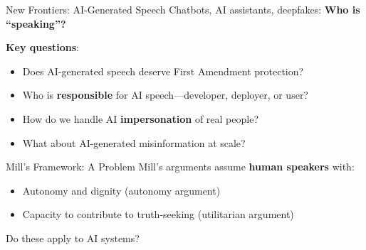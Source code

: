 ﻿\documentclass[aspectratio=169,11pt]{beamer}
\begin{document}
\begin{frame}{New Frontiers: AI-Generated Speech}
Chatbots, AI assistants, deepfakes: \textbf{Who is ``speaking''?}

\vspace{0.3cm}
\textbf{Key questions}:
\begin{itemize}
    \item Does AI-generated speech deserve First Amendment protection?
    \item Who is \textbf{responsible} for AI speech---developer, deployer, or user?
    \item How do we handle AI \textbf{impersonation} of real people?
    \item What about AI-generated misinformation at scale?
\end{itemize}

\vspace{0.3cm}
\begin{alertblock}{Mill's Framework: A Problem}
Mill's arguments assume \textbf{human speakers} with:
\begin{itemize}
    \item Autonomy and dignity (autonomy argument)
    \item Capacity to contribute to truth-seeking (utilitarian argument)
\end{itemize}
Do these apply to AI systems?
\end{alertblock}
\end{frame}
\end{document}
